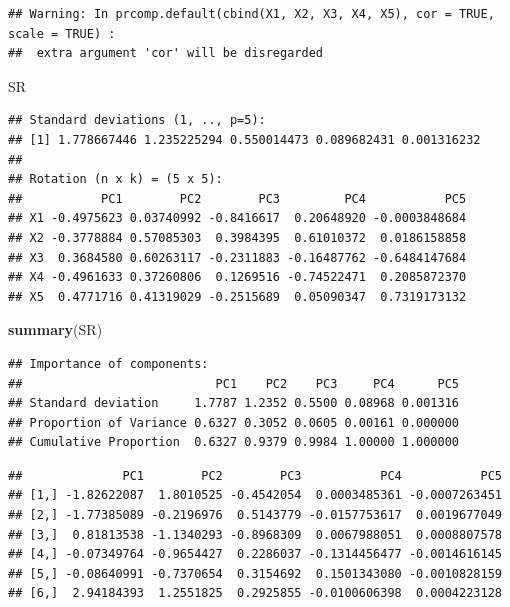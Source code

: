 \documentclass[
]{book}
\newenvironment{Shaded}{\begin{snugshade}}{\end{snugshade}}
\newcommand{\KeywordTok}[1]{\textcolor[rgb]{0.13,0.29,0.53}{\textbf{#1}}}
\newcommand{\NormalTok}[1]{#1}
\newcommand{\OperatorTok}[1]{\textcolor[rgb]{0.81,0.36,0.00}{\textbf{#1}}}
\begin{document}
\begin{verbatim}
## Warning: In prcomp.default(cbind(X1, X2, X3, X4, X5), cor = TRUE, scale = TRUE) :
##  extra argument 'cor' will be disregarded
\end{verbatim}

\begin{Shaded}
\begin{Highlighting}[]
\NormalTok{SR}
\end{Highlighting}
\end{Shaded}

\begin{verbatim}
## Standard deviations (1, .., p=5):
## [1] 1.778667446 1.235225294 0.550014473 0.089682431 0.001316232
## 
## Rotation (n x k) = (5 x 5):
##           PC1        PC2        PC3         PC4           PC5
## X1 -0.4975623 0.03740992 -0.8416617  0.20648920 -0.0003848684
## X2 -0.3778884 0.57085303  0.3984395  0.61010372  0.0186158858
## X3  0.3684580 0.60263117 -0.2311883 -0.16487762 -0.6484147684
## X4 -0.4961633 0.37260806  0.1269516 -0.74522471  0.2085872370
## X5  0.4771716 0.41319029 -0.2515689  0.05090347  0.7319173132
\end{verbatim}

\begin{Shaded}
\begin{Highlighting}[]
\KeywordTok{summary}\NormalTok{(SR)}
\end{Highlighting}
\end{Shaded}

\begin{verbatim}
## Importance of components:
##                           PC1    PC2    PC3     PC4      PC5
## Standard deviation     1.7787 1.2352 0.5500 0.08968 0.001316
## Proportion of Variance 0.6327 0.3052 0.0605 0.00161 0.000000
## Cumulative Proportion  0.6327 0.9379 0.9984 1.00000 1.000000
\end{verbatim}

\begin{Shaded}
\end{Shaded}

\begin{verbatim}
##              PC1        PC2        PC3           PC4           PC5
## [1,] -1.82622087  1.8010525 -0.4542054  0.0003485361 -0.0007263451
## [2,] -1.77385089 -0.2196976  0.5143779 -0.0157753617  0.0019677049
## [3,]  0.81813538 -1.1340293 -0.8968309  0.0067988051  0.0008807578
## [4,] -0.07349764 -0.9654427  0.2286037 -0.1314456477 -0.0014616145
## [5,] -0.08640991 -0.7370654  0.3154692  0.1501343080 -0.0010828159
## [6,]  2.94184393  1.2551825  0.2925855 -0.0100606398  0.0004223128
\end{verbatim}
\end{document}
